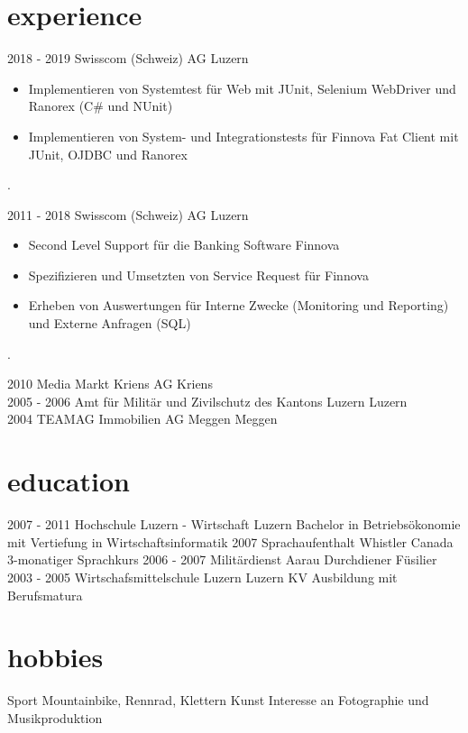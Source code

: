 \documentclass[]{cv-style} %
\begin{document}
\section{experience}
\begin{entrylist}
\entry
{2018 - 2019}
{Swisscom (Schweiz) AG}
{Luzern}
{
\begin{itemize}
  \item Implementieren von Systemtest für Web mit JUnit, Selenium WebDriver und Ranorex (C\# und NUnit)
  \item Implementieren von System- und Integrationstests für Finnova Fat Client mit JUnit, OJDBC und Ranorex
\end{itemize}
.}
\entry
  {2011 - 2018}
  {Swisscom (Schweiz) AG}
  {Luzern}
  {
\begin{itemize}
  \item Second Level Support für die Banking Software Finnova 
  \item Spezifizieren und Umsetzten von Service Request für Finnova
  \item Erheben von Auswertungen für Interne Zwecke (Monitoring und Reporting) und Externe Anfragen (SQL)
\end{itemize}
.}
\entry
  {2010}
  {Media Markt Kriens AG}
  {Kriens}
  {}\\
\entry
  {2005 - 2006}
  {Amt für Militär und Zivilschutz des Kantons Luzern}
  {Luzern}
  {}\\
\entry
  {2004}
  {TEAMAG Immobilien AG Meggen}
  {Meggen}
  {}
\end{entrylist}
\section{education}
\begin{entrylist}
\entry
{2007 - 2011}
{Hochschule Luzern - Wirtschaft}
{Luzern}
{Bachelor in Betriebsökonomie mit Vertiefung in Wirtschaftsinformatik}
\entry
{2007}
{Sprachaufenthalt}
{Whistler Canada}
{3-monatiger Sprachkurs}
\entry
{2006 - 2007}
{Militärdienst}
{Aarau}
{Durchdiener Füsilier}
\entry
{2003 - 2005}
{Wirtschafsmittelschule Luzern}
{Luzern}
{KV Ausbildung mit Berufsmatura}
\end{entrylist} 
\section{hobbies}
\begin{entrylist}
\entry
{}
{Sport}
{}
{Mountainbike, Rennrad, Klettern}
\entry
{}
{Kunst}
{}
{Interesse an Fotographie und Musikproduktion}
\end{entrylist}
\end{document}
